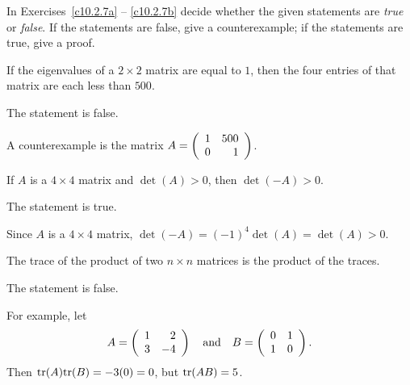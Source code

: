 \documentclass{ximera}
\begin{document}
\noindent In Exercises~\ref{c10.2.7a} -- \ref{c10.2.7b} decide whether 
the given statements are {\em true\/} or {\em false\/}. If the 
statements are false, give a counterexample; if the statements are true, 
give a proof.
\begin{exercise} \label{c10.2.7a}
If the eigenvalues of a $2\times 2$ matrix are equal to $1$,
then the four entries of that matrix are each less than $500$.

\begin{solution}

\ans The statement is false. 

\soln  A counterexample is the matrix $A = \left(\begin{array}{rr} 1 & 500\\ 0 &1\end{array}\right)$.

\end{solution}
\end{exercise}

\begin{exercise} \label{c10.2.7ab}
If $A$ is a $4\times 4$ matrix and $\det(A)>0$, then $\det(-A)>0$. 

\begin{solution}
\ans The statement is true.

\soln Since $A$ is a $4\times 4$ matrix, $\det(-A) = (-1)^4\det(A)=\det(A)>0$. 
\end{solution}
\end{exercise}

\begin{exercise} \label{c10.2.7b}
The trace of the product of two $n\times n$ matrices is the
product of the traces.

\begin{solution}
\ans The statement is false.

\soln For example, let
\[
A = \left(\begin{array}{rr} 1 & 2\\ 3 &-4\end{array}\right) \quad\mbox{and}\quad B = \left(\begin{array}{rr} 0 & 1\\ 1 &0\end{array}\right).
\]
Then ${\rm tr}(A){\rm tr}(B) = -3(0) = 0$, but ${\rm tr}(AB) = 5$.

\end{solution}
\end{exercise}
\end{document}
